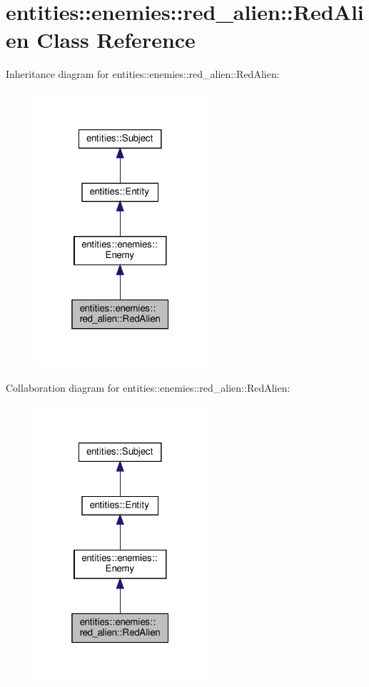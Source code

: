 \hypertarget{classentities_1_1enemies_1_1red__alien_1_1RedAlien}{}\section{entities\+:\+:enemies\+:\+:red\+\_\+alien\+:\+:Red\+Alien Class Reference}
\label{classentities_1_1enemies_1_1red__alien_1_1RedAlien}


Inheritance diagram for entities\+:\+:enemies\+:\+:red\+\_\+alien\+:\+:Red\+Alien\+:\nopagebreak
\begin{figure}[H]
\begin{center}
\leavevmode
\includegraphics[width=181pt]{classentities_1_1enemies_1_1red__alien_1_1RedAlien__inherit__graph}
\end{center}
\end{figure}


Collaboration diagram for entities\+:\+:enemies\+:\+:red\+\_\+alien\+:\+:Red\+Alien\+:\nopagebreak
\begin{figure}[H]
\begin{center}
\leavevmode
\includegraphics[width=181pt]{classentities_1_1enemies_1_1red__alien_1_1RedAlien__coll__graph}
\end{center}
\end{figure}

